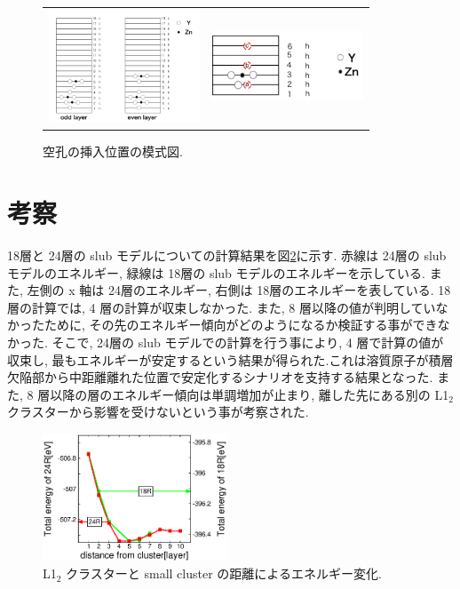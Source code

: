 \documentclass[a4j,twocolumn]{jsarticle}
\begin{document}
\begin{figure}
    \begin{tabular}{cc}
      \begin{minipage}{0.5\hsize}
        \centering
        \includegraphics[width=45mm]{small_cluster_slab18.png}
		\caption{slub モデルの模式図.}
		\label{slub}
      \end{minipage} &
      \begin{minipage}{0.5\hsize}
        \centering
        \includegraphics[width=45mm]{vacancyposition.png}
		\caption{空孔の挿入位置の模式図.}
		\label{vacancy}
      \end{minipage}
    \end{tabular}
  \end{figure}

\section{考察}
18層と 24層の slub モデルについての計算結果を図\ref{fig4.1}に示す. 赤線は 24層の slub モデルのエネルギー, 緑線は 18層の slub モデルのエネルギーを示している. また, 左側の x 軸は 24層のエネルギー, 右側は 18層のエネルギーを表している. 18 層の計算では, 4 層の計算が収束しなかった. また, 8 層以降の値が判明していなかったために, その先のエネルギー傾向がどのようになるか検証する事ができなかった. そこで, 24層の slub モデルでの計算を行う事により, 4 層で計算の値が収束し, 最もエネルギーが安定するという結果が得られた.これは溶質原子が積層欠陥部から中距離離れた位置で安定化するシナリオを支持する結果となった. また, 8 層以降の層のエネルギー傾向は単調増加が止まり, 離した先にある別の L1$_2$ クラスターから影響を受けないという事が考察された.


\begin{figure}[htbp]
\begin{center}
\includegraphics[width=55mm]{smallcluster_18_24.eps}
\caption{L1$_2$ クラスターと small cluster の距離によるエネルギー変化.}
\label{fig4.1}
\end{center}
\end{figure}
\end{document}
